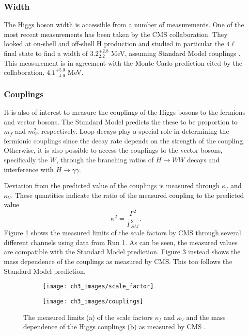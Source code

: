 \documentclass[10pt,a4paper]{book}
\begin{document}
\subsubsection{Width}
The Higgs boson width is accessible from a number of measurements. One of the most recent measurements has been taken by the CMS collaboration. They looked at on-shell and off-shell H production and studied in particular the $4\ell$ final state to find a width of $3.2^{+2.8}_{2.2}$ MeV, assuming Standard Model couplings \cite{CMS:2019ekd}. This measurement is in agreement with the Monte Carlo prediction cited by the collaboration, $4.1^{+5.0}_{-4.0}$ MeV.

\subsubsection{Couplings}
It is also of interest to measure the couplings of the Higgs bosons to the fermions and vector bosons. The Standard Model predicts the these to be proportion to $m_f$ and $m_{V}^2$, respectively. Loop decays play a special role in determining the fermionic couplings since the decay rate depends on the strength of the coupling. Otherwise, it is also possible to access the couplings to the vector bosons, specifically the $W$, through the branching ratios of $H \rightarrow WW$ decays and interference with $H \rightarrow \gamma\gamma$.

Deviation from the predicted value of the couplings is measured through $\kappa_f$ and $\kappa_V$. These quantities indicate the ratio of the measured coupling to the predicted value
\begin{equation}
\kappa^2 = \frac{\Gamma^2}{\Gamma_{SM}^2}.
\end{equation}
Figure \ref{scale factor} shows the measured limits of the scale factors by CMS through several different channels using data from Run 1. As can be seen, the measured values are compatible with the Standard Model prediction. Figure \ref{mass dependence} instead shows the mass dependence of the couplings as measured by CMS. This too follows the Standard Model prediction. 

\begin{figure}
\begin{subfigure}{.5\textwidth}
\centering
\texttt{[image: ch3\_images/scale\_factor]}
\label{scale factor}
\caption{}
\end{subfigure}
\begin{subfigure}{.5\textwidth}
\texttt{[image: ch3\_images/couplings]}
\label{mass dependence}
\caption{}
\end{subfigure}
\caption{The measured limits (a) of the scale factors $\kappa_f$ and $\kappa_V$ and the mass dependence of the Higgs couplings (b) as measured by CMS \cite{higgs_review}. }
\end{figure}
\end{document}
